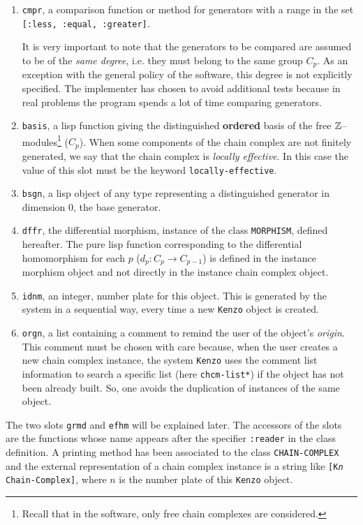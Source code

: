 \begin{enumerate}
\item {\tt cmpr}, a comparison function or method for  generators with a range in the set
{\tt [:less, :equal, :greater]}.
\par
It is very important to note that the generators to be compared are assumed to be
of the {\em same degree}, i.e. they must belong to the same group $C_p$. As an exception with
the general policy of the software, this degree is not explicitly specified.
The implementer has chosen to avoid additional tests because in real problems the program spends
a lot of time comparing generators.
\item {\tt basis}, a lisp function giving the distinguished {\bf ordered} basis of the free ${\mathbb{Z}}$--modules\footnote{
Recall that in the software, only free chain complexes are considered.} ($C_p$).  When
some  components of the chain complex  are not finitely generated, we say that the chain complex
is {\em locally effective}. In this case the value of this slot must be the keyword
{\tt locally-effective}.
\item {\tt bsgn}, a lisp object of any type representing a distinguished generator in dimension $0$, the
base generator.
\item {\tt dffr}, the differential morphism, instance of the class {\tt MORPHISM}, defined hereafter.
The pure lisp function corresponding to the differential homomorphism
for each $p$ ($d_p : C_p \rightarrow C_{p-1}$) is defined in the instance morphism  object and
not directly in the instance chain complex object.
\item {\tt idnm}, an integer, number plate for this object. This is generated by
the system in a sequential way, every time a new {\tt Kenzo} object is created.
\item {\tt orgn}, a list containing a comment to remind the user of the object's {\em origin}.
This comment must be chosen with care because, when the user creates a new chain complex instance,
the  system {\tt Kenzo} uses the comment list information to search
a specific list (here {\tt *chcm-list*}) if the object has not been already built. So, one avoids
the  duplication of instances of the same object.
\end{enumerate}
The two slots {\tt grmd} and {\tt efhm} will be explained later.
The accessors of the slots are the functions whose name appears after the specifier {\tt:reader} in
the class definition. A printing method has been associated to the class {\tt CHAIN-COMPLEX}
and the external representation of a chain complex instance is a string like {\tt [K{\em n} Chain-Complex]},
where $n$ is the number plate of this {\tt Kenzo} object.

